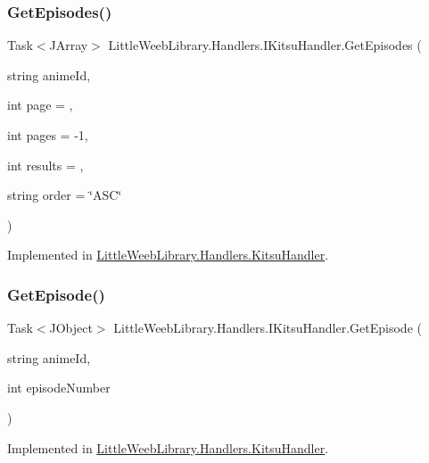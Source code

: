 \subsubsection{\texorpdfstring{Get\+Episodes()}{GetEpisodes()}}
{\footnotesize\ttfamily Task$<$J\+Array$>$ Little\+Weeb\+Library.\+Handlers.\+I\+Kitsu\+Handler.\+Get\+Episodes (\begin{DoxyParamCaption}\item[{string}]{anime\+Id,  }\item[{int}]{page = {},  }\item[{int}]{pages = {\ttfamily -\/1},  }\item[{int}]{results = {},  }\item[{string}]{order = {\ttfamily \char`\"{}ASC\char`\"{}} }\end{DoxyParamCaption})}



Implemented in \mbox{\hyperlink{class_little_weeb_library_1_1_handlers_1_1_kitsu_handler_a615caf4bea96465d35eb36434bc71bea}{Little\+Weeb\+Library.\+Handlers.\+Kitsu\+Handler}}.

\mbox{\label{interface_little_weeb_library_1_1_handlers_1_1_i_kitsu_handler_a9f182eabb098e98f566c8add1695bb36}} 
\subsubsection{\texorpdfstring{Get\+Episode()}{GetEpisode()}}
{\footnotesize\ttfamily Task$<$J\+Object$>$ Little\+Weeb\+Library.\+Handlers.\+I\+Kitsu\+Handler.\+Get\+Episode (\begin{DoxyParamCaption}\item[{string}]{anime\+Id,  }\item[{int}]{episode\+Number }\end{DoxyParamCaption})}



Implemented in \mbox{\hyperlink{class_little_weeb_library_1_1_handlers_1_1_kitsu_handler_a3129d77267b0fb879e3f8f1a8e83494a}{Little\+Weeb\+Library.\+Handlers.\+Kitsu\+Handler}}.

